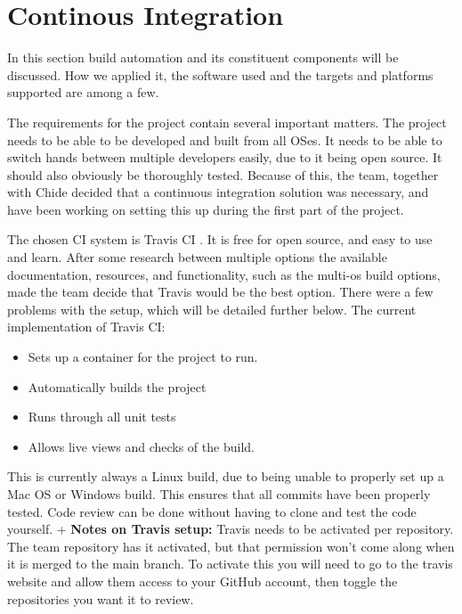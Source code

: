 \documentclass[10pt]{extarticle} %
\begin{document}
    \newpage
    \section{Continous Integration}
    In this section build automation and its constituent components will be discussed.
    How we applied it, the software used and the targets and platforms supported are among a few.

    The requirements for the project contain several important matters.
    The project needs to be able to be developed and built from all OSes.
    It needs to be able to switch hands between multiple developers easily, due to it being open source.
    It should also obviously be thoroughly tested.
    Because of this, the team, together with Chide decided that a continuous integration solution was necessary, and have been working on setting this up during the first part of the project.

    The chosen CI system is Travis CI .
    It is free for open source, and easy to use and learn.
    After some research between multiple options the available documentation, resources, and functionality, such as the multi-os build options, made the team decide that Travis would be the best option.
    There were a few problems with the setup, which will be detailed further below.
    The current implementation of Travis CI:
    \begin{itemize}
         \item Sets up a container for the project to run.
         \item Automatically builds the project
         \item Runs through all unit tests
         \item Allows live views and checks of the build.
    \end{itemize}
    This is currently always a Linux build, due to being unable to properly set up a Mac OS or Windows build.
    This ensures that all commits have been properly tested.
    Code review can be done without having to clone and test the code yourself.
    +
    \textbf{Notes on Travis setup:}
    Travis needs to be activated per repository.
    The team repository has it activated, but that permission won't come along when it is merged to the main branch.
    To activate this you will need to go to the travis website and allow them access to your GitHub account, then toggle the repositories you want it to review.
\end{document}
